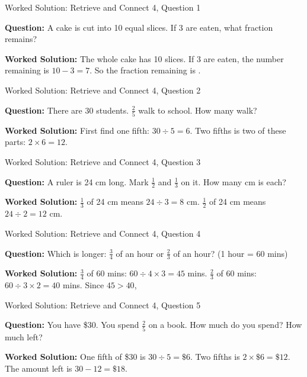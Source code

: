 \documentclass{beamer}
\newcommand{\ablank}[1]{%
  \alt<2>{\textcolor{red}{#1}}{\underline{\phantom{#1}}}%
}
\newcommand{\ashow}[1]{\uncover<2->{\textcolor{red}{\small #1}}}
\begin{document}
\begin{frame}{Worked Solution: Retrieve and Connect 4, Question 1}
\hypertarget{work-st4}{}

\textbf{Question:} A cake is cut into 10 equal slices. If 3 are eaten, what fraction remains?

\textbf{Worked Solution:} The whole cake has 10 slices. If 3 are eaten, the number remaining is $10-3=7$. So the fraction remaining is \ablank{$\frac{7}{10}$}.
\end{frame}

\begin{frame}{Worked Solution: Retrieve and Connect 4, Question 2}

\textbf{Question:} There are 30 students. $\frac{2}{5}$ walk to school. How many walk?

\textbf{Worked Solution:} First find one fifth: $30 \div 5 = 6$. Two fifths is two of these parts: $2 \times 6 = 12$. \ashow{12 students walk.}
\end{frame}

\begin{frame}{Worked Solution: Retrieve and Connect 4, Question 3}

\textbf{Question:} A ruler is 24 cm long. Mark $\frac{1}{2}$ and $\frac{1}{3}$ on it. How many cm is each?

\textbf{Worked Solution:} $\frac13$ of 24 cm means $24 \div 3 = 8$ cm. $\frac12$ of 24 cm means $24 \div 2 = 12$ cm. \ashow{$\frac13 = 8$ cm and $\frac12 = 12$ cm.}
\end{frame}

\begin{frame}{Worked Solution: Retrieve and Connect 4, Question 4}

\textbf{Question:} Which is longer: $\frac{3}{4}$ of an hour or $\frac{2}{3}$ of an hour? (1 hour = 60 mins)

\textbf{Worked Solution:} $\frac34$ of 60 mins: $60 \div 4 \times 3 = 45$ mins. $\frac23$ of 60 mins: $60 \div 3 \times 2 = 40$ mins. Since $45 > 40$, \ashow{$\frac34$ hour is longer.}
\end{frame}

\begin{frame}{Worked Solution: Retrieve and Connect 4, Question 5}

\textbf{Question:} You have \$30. You spend $\frac{2}{5}$ on a book. How much do you spend? How much left?

\textbf{Worked Solution:} One fifth of \$30 is $30 \div 5 = \$6$. Two fifths is $2 \times \$6 = \$12$. The amount left is $30 - 12 = \$18$. \ashow{Spend \$12, left \$18.}
\end{frame}
\end{document}
